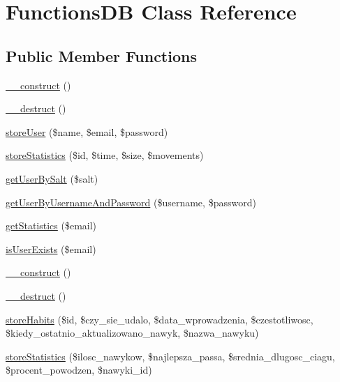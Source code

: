 \hypertarget{class_functions_d_b}{}\section{Functions\+D\+B Class Reference}
\label{class_functions_d_b}
\subsection*{Public Member Functions}
\begin{DoxyCompactItemize}
\item 
\hyperlink{class_functions_d_b_a095c5d389db211932136b53f25f39685}{\+\_\+\+\_\+construct} ()
\item 
\hyperlink{class_functions_d_b_a421831a265621325e1fdd19aace0c758}{\+\_\+\+\_\+destruct} ()
\item 
\hyperlink{class_functions_d_b_aa4f30ca39951d38ff9eb43a3a5501562}{store\+User} (\$name, \$email, \$password)
\item 
\hyperlink{class_functions_d_b_aa9c7bc59cd010c3edabccad21e66a621}{store\+Statistics} (\$id, \$time, \$size, \$movements)
\item 
\hyperlink{class_functions_d_b_a01498755f9fdf9217e79242c8a077c5b}{get\+User\+By\+Salt} (\$salt)
\item 
\hyperlink{class_functions_d_b_af78c761434385cd1d19aac4da139a91a}{get\+User\+By\+Username\+And\+Password} (\$username, \$password)
\item 
\hyperlink{class_functions_d_b_a2c1caf74046b1cdcae6f3ff34e36be36}{get\+Statistics} (\$email)
\item 
\hyperlink{class_functions_d_b_a3b820a28b2bf697eeeeed33d3438e754}{is\+User\+Exists} (\$email)
\item 
\hyperlink{class_functions_d_b_a095c5d389db211932136b53f25f39685}{\+\_\+\+\_\+construct} ()
\item 
\hyperlink{class_functions_d_b_a421831a265621325e1fdd19aace0c758}{\+\_\+\+\_\+destruct} ()
\item 
\hyperlink{class_functions_d_b_ad389f5d1cd3ad0debdef9cf366cd4954}{store\+Habits} (\$id, \$czy\+\_\+sie\+\_\+udalo, \$data\+\_\+wprowadzenia, \$czestotliwosc, \$kiedy\+\_\+ostatnio\+\_\+aktualizowano\+\_\+nawyk, \$nazwa\+\_\+nawyku)
\item 
\hyperlink{class_functions_d_b_aa8ac3b0c2bfe52ca81319fed50aea20b}{store\+Statistics} (\$ilosc\+\_\+nawykow, \$najlepsza\+\_\+passa, \$srednia\+\_\+dlugosc\+\_\+ciagu, \$procent\+\_\+powodzen, \$nawyki\+\_\+id)
\item 

\end{DoxyCompactItemize}
